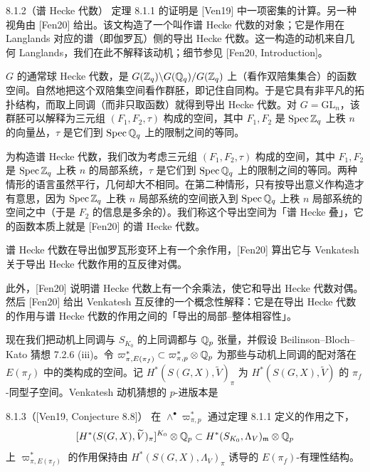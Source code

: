\begin{rem}{8.1.2}（谱 Hecke 代数）\label{thm:a6-05-10}
定理 8.1.1 的证明是 [Ven19] 中一项密集的计算。另一种视角由 [Fen20] 给出。该文构造了一个叫作谱 Hecke 代数的对象；它是作用在 Langlands 对应的谱（即伽罗瓦）侧的导出 Hecke 代数。这一构造的动机来自几何 Langlands，我们在此不解释该动机；细节参见 [Fen20, Introduction]。
\end{rem}

$G$ 的通常球 Hecke 代数，是 $G(\mathbb{Z}_q)\backslash G(\mathbb{Q}_q)/G(\mathbb{Z}_q)$ 上（看作双陪集集合）的函数空间。自然地把这个双陪集空间看作群胚，即记住自同构。于是它具有非平凡的拓扑结构，而取上同调（而非只取函数）就得到导出 Hecke 代数。对 $G=\mathrm{GL}_n$，该群胚可以解释为三元组 $(F_1,F_2,\tau)$ 构成的空间，其中 $F_1,F_2$ 是 $\operatorname{Spec}\mathbb{Z}_q$ 上秩 $n$ 的向量丛，$\tau$ 是它们到 $\operatorname{Spec}\mathbb{Q}_q$ 上的限制之间的等同。

为构造谱 Hecke 代数，我们改为考虑三元组 $(F_1,F_2,\tau)$ 构成的空间，其中 $F_1,F_2$ 是 $\operatorname{Spec}\mathbb{Z}_q$ 上秩 $n$ 的局部系统，$\tau$ 是它们到 $\operatorname{Spec}\mathbb{Q}_q$ 上的限制之间的等同。两种情形的语言虽然平行，几何却大不相同。在第二种情形，只有按导出意义作构造才有意思，因为 $\operatorname{Spec}\mathbb{Z}_q$ 上秩 $n$ 局部系统的空间嵌入到 $\operatorname{Spec}\mathbb{Q}_q$ 上秩 $n$ 局部系统的空间之中（于是 $F_2$ 的信息是多余的）。我们称这个导出空间为「谱 Hecke 叠」，它的函数本质上就是 [Fen20] 的谱 Hecke 代数。

谱 Hecke 代数在导出伽罗瓦形变环上有一个余作用，[Fen20] 算出它与 Venkatesh 关于导出 Hecke 代数作用的互反律对偶。

此外，[Fen20] 说明谱 Hecke 代数上有一个余乘法，使它和导出 Hecke 代数对偶。然后 [Fen20] 给出 Venkatesh 互反律的一个概念性解释：它是在导出 Hecke 代数的作用与谱 Hecke 代数的作用之间的「导出的局部--整体相容性」。

现在我们把动机上同调与 $S_{K_0}$ 的上同调都与 $\mathbb{Q}_p$ 张量，并假设 Beilinson--Bloch--Kato 猜想 7.2.6 (iii)。令 $\varpi^*_{\pi,E(\pi_f)}\subset\varpi^*_{\pi,p}\otimes\mathbb{Q}_p$ 为那些与动机上同调的配对落在 $E(\pi_f)$ 中的类构成的空间。记 $H^*(S(G,X),\widetilde V)_\pi$ 为 $H^*(S(G,X),\widetilde V)$ 的 $\pi_f$-同型子空间。Venkatesh 动机猜想的 $p$-进版本是

\begin{conj}{8.1.3}（[Ven19, Conjecture 8.8]）\label{thm:a6-05-11}
在 $\wedge^\bullet\varpi^*_{\pi,p}$ 通过定理 8.1.1 定义的作用之下，
\[
[H^*(S(G,X),\widetilde V)_\pi]^{K_0}\otimes\mathbb{Q}_p\subset H^*(S_{K_0},\Lambda_V)_{\mathfrak m}\otimes\mathbb{Q}_p
\]
上 $\varpi^*_{\pi,E(\pi_f)}$ 的作用保持由 $H^*(S(G,X),\Lambda_V)_\pi$ 诱导的 $E(\pi_f)$-有理性结构。
\end{conj}

